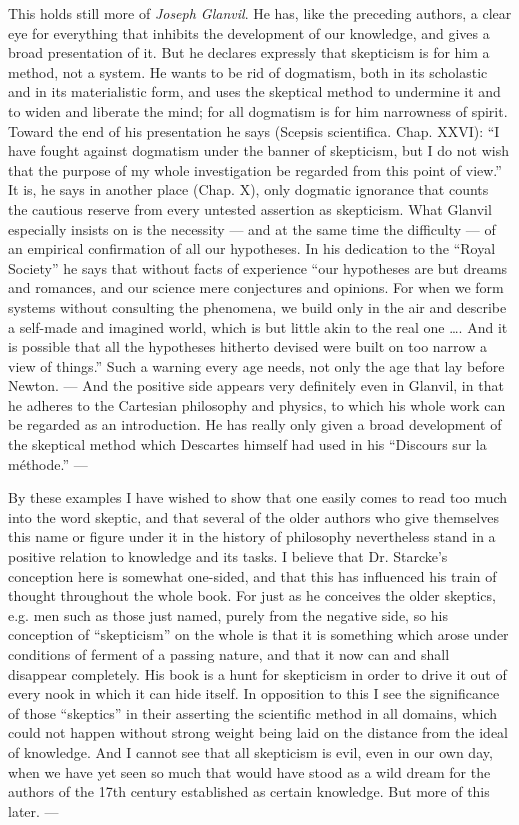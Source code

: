 \documentclass[12pt,a4paper,openany]{book}
\newcommand{\opage}[1]{\marginnote{\footnotesize\textit{[#1]}}}
\begin{document}
This holds still more of \emph{Joseph Glanvil}. He has,
like the preceding authors, a clear eye for everything
that inhibits the development of our knowledge, and gives a broad
presentation of it. But he declares expressly that
skepticism is for him a method, not a system. He wants
to be rid of dogmatism, both in its scholastic and in its
materialistic form, and uses the skeptical method to
undermine it and to widen and liberate the mind; for all
dogmatism is for him narrowness of spirit. Toward the end
of his presentation he says (Scepsis scientifica. Chap. XXVI):
``I have fought against dogmatism under the banner of
skepticism, but I do not wish that the purpose
of my whole investigation be regarded from this point of view.'' It is,
he says in another place (Chap. X), only dogmatic
ignorance that counts the cautious reserve from
every untested assertion as skepticism. What Glanvil especially
insists on is the necessity --- and at the same time the difficulty
--- of an empirical confirmation of all our hypotheses. In his
dedication to the ``Royal Society'' he says that without
facts of experience ``our hypotheses are but dreams and
romances, and our science mere conjectures and opinions. For
when we form systems without consulting the phenomena,
we build only in the air and describe a self-made and imagined
\opage{22}world, which is but little akin to the real one \ldots.
And it is possible that all the hypotheses hitherto devised were built
on too narrow a view of things.'' Such a
warning every age needs, not only the age that
lay before Newton. --- And the positive side appears
very definitely even in Glanvil, in that he adheres to the
Cartesian philosophy and physics, to which his whole work
can be regarded as an introduction. He has really only
given a broad development of the skeptical method which
Descartes himself had used in his ``Discours sur la méthode.'' ---

By these examples I have wished to show that one easily comes
to read too much into the word skeptic, and that several
of the older authors who give themselves this name
or figure under it in the history of philosophy nevertheless stand in
a positive relation to knowledge and its tasks. I
believe that Dr. Starcke's conception here is somewhat one-sided, and that
this has influenced his train of thought throughout the whole book.
For just as he conceives the older skeptics,
e.g. men such as those just named, purely from the negative
side, so his conception of ``skepticism'' on the whole
is that it is something which arose under conditions of ferment of
a passing nature, and that it now can and shall disappear
completely. His book is a hunt for skepticism in order
to drive it out of every nook in which it can hide
itself. In opposition to this I see the significance of those ``skeptics''
in their asserting the scientific method in all
domains, which could not happen without strong weight being laid
on the distance from the ideal of knowledge. And I
cannot see that all skepticism is evil, even in
our own day, when we have yet seen so much that would have
stood as a wild dream for the authors of the 17th century
established as certain knowledge. But more
of this later. ---
\end{document}
